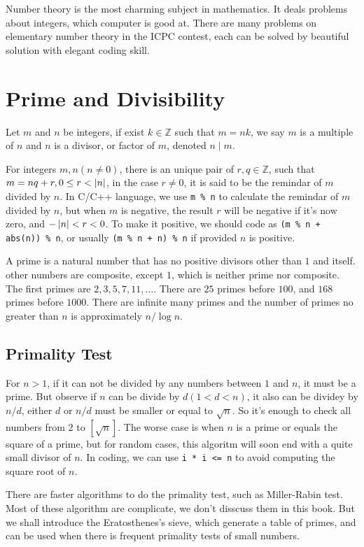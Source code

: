 Number theory is the most charming subject in mathematics.
It deals problems about integers, which computer is good at.
There are many problems on elementary number theory in the ICPC contest,
each can be solved by beautiful solution with elegant coding skill.

\section{Prime and Divisibility}
Let $m$ and $n$ be integers, if exist $k\in \mathbb{Z}$ such that $m=nk$,
we say $m$ is a multiple of $n$ and $n$ is a divisor, or factor of $m$, denoted $n\mid m$.

For integers $m, n(n\neq 0)$, there is an unique pair of $r, q \in \mathbb{Z}$,
such that $m=nq+r, 0 \leq r < \left| {n} \right|$, in the case $r\neq 0$,
it is said to be the remindar of $m$ divided by $n$.
In C/C++ language, we use \verb|m % n| to calculate the remindar of $m$ divided by $n$,
but when $m$ is negative, the result $r$ will be negative if it's now zero, and $-\left| {n} \right| < r < 0$.
To make it positive, we should code as \verb|(m % n + abs(n)) % n|,
or usually \verb|(m % n + n) % n| if provided $n$ is positive.

A prime is a natural number that has no positive divisors other than $1$ and itself.
other numbers are composite, except $1$, which is neither prime nor composite.
The first primes are $2, 3, 5, 7, 11, \dots$. There are $25$ primes before $100$, and $168$ primes before $1000$.
There are infinite many primes and the number of primes no greater than $n$ is approximately $n / \log n$.

\subsection{Primality Test}
For $n > 1$, if it can not be divided by any numbers between $1$ and $n$, it must be a prime.
But observe if $n$ can be divide by $d(1 < d < n)$, it also can be dividey by $n / d$,
either $d$ or $n / d$ must be smaller or equal to $\sqrt{n}$.
So it's enough to check all numbers from $2$ to $\left[\sqrt{n}\right]$.
The worse case is when $n$ is a prime or equals the square of a prime,
but for random cases, this algoritm will soon end with a quite small divisor of $n$.
In coding, we can use \verb|i * i <= n| to avoid computing the square root of $n$.


There are faster algorithms to do the primality test, such as Miller-Rabin test.
Most of these algorithm are complicate, we don't disscuss them in this book.
But we shall introduce the Eratosthenes's sieve, which generate a table of primes,
and can be used when there is frequent primality tests of small numbers.

